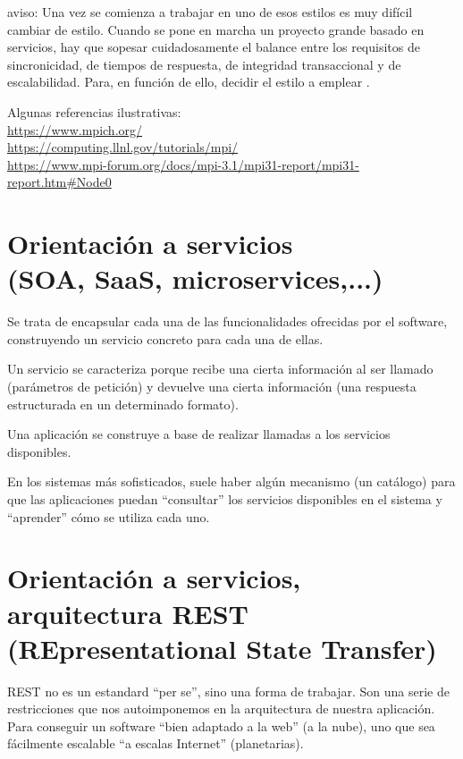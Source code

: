 \documentclass[spanish,12pt,a4paper,final,oneside]{book}
\begin{document}
aviso: Una vez se comienza a trabajar en uno de esos estilos es muy difícil cambiar de estilo. Cuando se pone en marcha un proyecto grande basado en servicios, hay que sopesar cuidadosamente el balance entre los requisitos de sincronicidad, de tiempos de respuesta, de integridad transaccional y de escalabilidad. Para, en función de ello, decidir el estilo a emplear .



\vspace{1cm}
Algunas referencias ilustrativas:
\\ \url{https://www.mpich.org/}
\\ \url{https://computing.llnl.gov/tutorials/mpi/}
\\ \url{https://www.mpi-forum.org/docs/mpi-3.1/mpi31-report/mpi31-report.htm#Node0}



\section{Orientación a servicios \\ (SOA, SaaS, microservices,...) }
Se trata de encapsular cada una de las funcionalidades ofrecidas por el software, construyendo un servicio concreto para cada una de ellas. 

Un servicio se caracteriza porque recibe una cierta información al ser llamado (parámetros de petición) y devuelve una cierta información (una respuesta estructurada en un determinado formato).

Una aplicación se construye a base de realizar llamadas a los servicios disponibles.

En los sistemas más sofisticados, suele haber algún mecanismo (un catálogo) para que las aplicaciones puedan ``consultar'' los servicios disponibles en el sistema y ``aprender'' cómo se utiliza cada uno.



\section{Orientación a servicios, arquitectura REST \\(REpresentational State Transfer)}

REST no es un estandard ``per se'', sino una forma de trabajar. Son una serie de restricciones que nos autoimponemos en la arquitectura de nuestra aplicación. Para conseguir un software ``bien adaptado a la web'' (a la nube), uno que sea fácilmente escalable ``a escalas Internet'' (planetarias).
\end{document}
